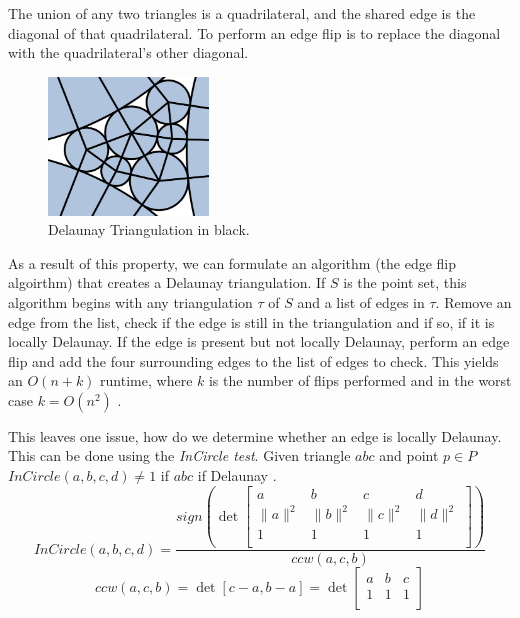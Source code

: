 \documentclass[11pt]{article}
\theoremstyle{definition}
\begin{document}
	The union of any two triangles is a quadrilateral, and the shared edge is the diagonal of that quadrilateral. 
	To perform an edge flip is to replace the diagonal with the quadrilateral's other diagonal.

	\begin{figure}
  		\begin{center}
    		\includegraphics[width=0.38\textwidth]{delaunayemph}
  		\end{center}
  		\caption{Delaunay Triangulation in black.}
	\end{figure}
	As a result of this property, we can formulate an algorithm (the edge flip algoirthm) that creates a Delaunay triangulation. 
	If $S$ is the point set, this algorithm begins with any triangulation $\tau$ of $S$ and a list of edges in $\tau$. 
	Remove an edge from the list, check if the edge is still in the triangulation and if so, if it is locally Delaunay. 
	If the edge is present but not locally Delaunay, perform an edge flip and add the four surrounding edges to the list of edges to check. 
	This yields an $O(n + k)$ runtime, where $k$ is the number of flips performed and in the worst case $k = O(n^2)$ \cite{meshGeneration}.

	This leaves one issue, how do we determine whether an edge is locally Delaunay. 
	This can be done using the \emph{InCircle test}. 
	Given triangle $abc$ and point $p \in P$ $InCircle(a,b,c,d) \neq 1$ if $abc$ if Delaunay \cite{princeton:CCW}. 
	\begin{equation}
		InCircle(a,b,c,d) = \frac{sign(\det
		\begin{bmatrix}
    			a & b & c & d \\
    			\|a\|^2 & \|b\|^2 & \|c\|^2 & \|d\|^2 \\
    			1 & 1 & 1 & 1 \\
		\end{bmatrix} 
		)}{ccw(a,c,b)}
	\end{equation}
	\begin{equation}
		ccw(a,c,b) = \det[c-a,b-a] = \det
		\begin{bmatrix}
    			a & b & c \\
    			1 & 1 & 1\\
		\end{bmatrix} 
	\end{equation} 
	
\end{document}
